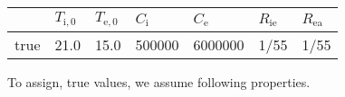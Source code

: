 \documentclass[
]{article}
\begin{document}
\begin{longtable}[]{@{}lllllll@{}}
\toprule
\begin{minipage}[b]{0.10\columnwidth}\raggedright
\strut
\end{minipage} & \begin{minipage}[b]{0.10\columnwidth}\raggedright
\(T_{\text{i},0}\)\strut
\end{minipage} & \begin{minipage}[b]{0.10\columnwidth}\raggedright
\(T_{\text{e},0}\)\strut
\end{minipage} & \begin{minipage}[b]{0.15\columnwidth}\raggedright
\(C_{\text{i}}\)\strut
\end{minipage} & \begin{minipage}[b]{0.17\columnwidth}\raggedright
\(C_{\text{e}}\)\strut
\end{minipage} & \begin{minipage}[b]{0.10\columnwidth}\raggedright
\(R_{\text{ie}}\)\strut
\end{minipage} & \begin{minipage}[b]{0.10\columnwidth}\raggedright
\(R_{\text{ea}}\)\strut
\end{minipage}\tabularnewline
\midrule
\endhead
\begin{minipage}[t]{0.10\columnwidth}\raggedright
true\strut
\end{minipage} & \begin{minipage}[t]{0.10\columnwidth}\raggedright
21.0\strut
\end{minipage} & \begin{minipage}[t]{0.10\columnwidth}\raggedright
15.0\strut
\end{minipage} & \begin{minipage}[t]{0.15\columnwidth}\raggedright
500000\strut
\end{minipage} & \begin{minipage}[t]{0.17\columnwidth}\raggedright
6000000\strut
\end{minipage} & \begin{minipage}[t]{0.10\columnwidth}\raggedright
1/55\strut
\end{minipage} & \begin{minipage}[t]{0.10\columnwidth}\raggedright
1/55\strut
\end{minipage}\tabularnewline
\bottomrule
\end{longtable}

To assign, true values, we assume following properties.
\end{document}
